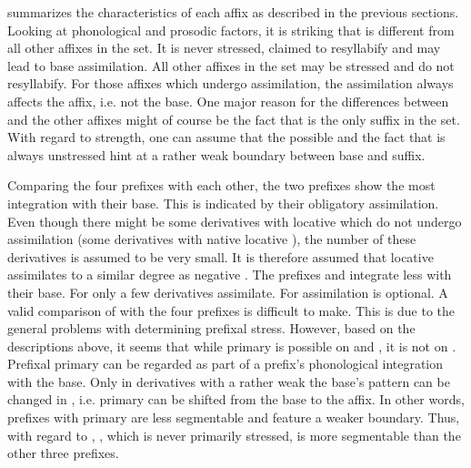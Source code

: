  summarizes the characteristics of each affix as described in the previous sections. Looking at phonological and prosodic factors, it is striking that  is different from all other affixes in the set. It is never stressed, claimed to resyllabify and may lead to base assimilation. All other affixes in the set may be stressed and do not resyllabify. For those affixes which undergo assimilation, the assimilation always affects the affix, i.e. not the base. One major reason for the differences between  and the other affixes might of course be the fact that  is the only suffix in the set. With regard to  strength, one can assume that the possible  and the fact that  is always unstressed hint at a rather weak boundary between base and suffix.

Comparing the four prefixes with each other, the two prefixes show the most integration with their base. This is indicated by their obligatory assimilation. Even though there might be some derivatives with locative  which do not undergo assimilation (some derivatives with native locative ), the number of these derivatives is assumed to be very small. It is therefore assumed that locative  assimilates to a similar degree as negative . The prefixes  and  integrate less with their base. For  only a few derivatives assimilate. For  assimilation is optional. 
A valid comparison of  with the four prefixes is difficult to make. This is due to the general problems with determining prefixal stress.  However, based on the descriptions above, it seems that while primary  is possible on  and , it is not on . Prefixal primary  can be regarded as part of a prefix's phonological integration with the base. Only in derivatives with a rather weak  the base's  pattern can be changed in , i.e. primary  can be shifted from the base to the affix. In other words, prefixes with primary  are less segmentable and feature a weaker boundary. Thus, with regard to , , which is never primarily stressed, is more segmentable than the other three prefixes.

